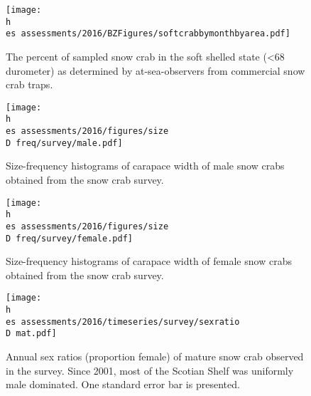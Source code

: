\documentclass[11pt]{article}
\newcommand{\D}{.}
\newcommand{\h}{\string~/}
\newcommand{\es}{bio.data/bio.snowcrab/}
\begin{document}
\clearpage



\begin{figure}
\centering
\texttt{[image: \\h \\es assessments/2016/BZFigures/softcrabbymonthbyarea.pdf]}
\caption{The percent of sampled snow crab in the soft shelled state (<68 durometer) as determined by at-sea-observers from commercial snow crab traps.}
\end{figure}
\clearpage


\begin{figure}
\centering
\texttt{[image: \\h \\es assessments/2016/figures/size\\D freq/survey/male.pdf]}\\ 
\caption{Size-frequency histograms of carapace width of male snow crabs obtained from the snow crab survey.  }
\end{figure}
\clearpage

\begin{figure}
\centering
\texttt{[image: \\h \\es assessments/2016/figures/size\\D freq/survey/female.pdf]}\\ 
\caption{ Size-frequency histograms of carapace width of female snow crabs obtained from the snow crab survey. }
\end{figure}
\clearpage

\begin{figure}
\centering
\texttt{[image: \\h \\es assessments/2016/timeseries/survey/sexratio\\D mat.pdf]}\\ 
\caption{ Annual sex ratios (proportion female) of mature snow crab observed in the survey. Since 2001, most of the Scotian Shelf was uniformly male dominated. One standard error bar is presented.}
\end{figure}
\clearpage
\end{document}
